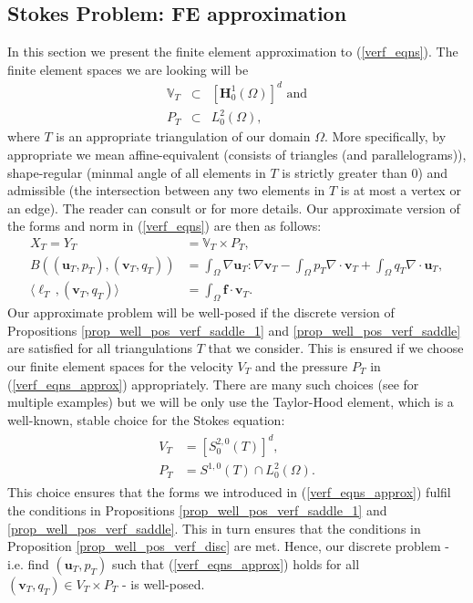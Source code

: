 \documentclass[12pt,a4paper]{article}
\theoremstyle{definition}
\begin{document}
\subsection{Stokes Problem: FE approximation}
In this section we present the finite element approximation to (\ref{verf_eqns}).  The finite element spaces we are looking will be
\begin{eqnarray}
	\mathbb{V}_T&\subset&\left[\textbf{H}^1_0\left(\Omega\right)\right]^d \text{ and}\nonumber\\
	P_T&\subset& L^2_0\left(\Omega\right),\nonumber
\end{eqnarray}
where $T$ is an appropriate triangulation of our domain $\Omega$.  More specifically, by appropriate we mean affine-equivalent (consists of triangles (and parallelograms)), shape-regular (minmal angle of all elements in $T$ is strictly greater than $0$)  and admissible (the intersection between any two elements in $T$ is at most a vertex or an edge).  The reader can consult \cite{verfurth2013posteriori} or \cite{brenner2007mathematical} for more details.
Our approximate version of the forms and norm in (\ref{verf_eqns}) are then as follows:
\begin{equation}\label{verf_eqns_approx}
\begin{aligned}
X_T=Y_T&=\mathbb{V}_T\times P_T,\\
B\left(\left(\textbf{u}_T,p_T\right),\left(\textbf{v}_T,q_T\right)\right)&=\int_{\Omega}\nabla \textbf{u}_T : \nabla \textbf{v}_T - \int_{\Omega} p_T \nabla\cdot\textbf{v}_T + \int_{\Omega} q_T \nabla\cdot\textbf{u}_T,\\
\langle \ell_T\,,\left(\textbf{v}_T,q_T\right) \rangle &= \int_{\Omega}\textbf{f}\cdot \textbf{v}_T.
\end{aligned}
\end{equation}
Our approximate problem will be well-posed if the discrete version of Propositions \ref{prop_well_pos_verf_saddle_1} and \ref{prop_well_pos_verf_saddle} are satisfied for all triangulations $T$ that we consider.  This is ensured if we choose our finite element spaces for the velocity $V_T$ and the pressure $P_T$ in (\ref{verf_eqns_approx}) appropriately.
There are many such choices (see \cite[\S 4.10.2]{verfurth2013posteriori} for multiple examples) but we will be only use the Taylor-Hood element, which is a well-known, stable choice for the Stokes equation:
\begin{eqnarray}
\begin{aligned}
V_T&=\left[S^{2,0}_0\left(T\right)\right]^d,\\
P_T&=S^{1,0}\left(T\right)\cap L^2_0\left(\Omega\right).
\end{aligned}
\end{eqnarray}
This choice ensures that the forms we introduced in (\ref{verf_eqns_approx}) fulfil the conditions in Propositions \ref{prop_well_pos_verf_saddle_1} and \ref{prop_well_pos_verf_saddle}.  This in turn ensures that the conditions in Proposition \ref{prop_well_pos_verf_disc} are met.  Hence, our discrete problem - i.e. find $\left(\textbf{u}_T, p_T\right)$ such that (\ref{verf_eqns_approx}) holds for all $\left(\textbf{v}_T,q_T\right)\in V_T\times P_T$ - is well-posed.
\end{document}
